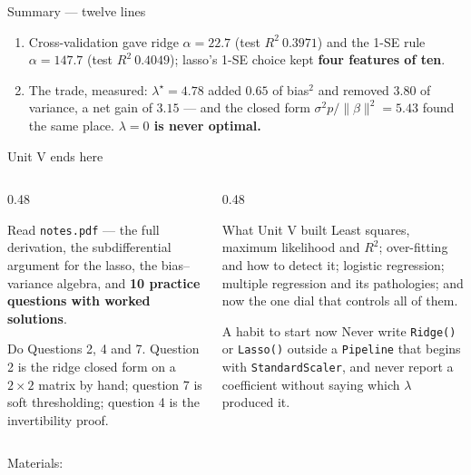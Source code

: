 \documentclass[aspectratio=169]{beamer}
\begin{document}
\begin{frame}[shrink=16]{Summary --- twelve lines}
\begin{enumerate}
      intercept by exactly $500.0000$ and no coefficient by more than
      $1.3\times10^{-14}$. Penalise it and $R^2 = -3.84$.
    \item Cross-validation gave ridge $\alpha = 22.7$ (test $R^2\ 0.3971$) and
      the 1-SE rule $\alpha = 147.7$ (test $R^2\ \mathbf{0.4049}$); lasso's
      1-SE choice kept \textbf{four features of ten}.
    \item The trade, measured: $\lambda^\star = 4.78$ added $0.65$ of
      bias$^2$ and removed $3.80$ of variance, a net gain of $3.15$ --- and
      the closed form $\sigma^2p/\|\beta\|^2 = 5.43$ found the same place.
      \textbf{$\lambda = 0$ is never optimal.}
  \end{enumerate}
\end{frame}

\begin{frame}[shrink=4]{Unit V ends here}
  \begin{columns}[T]
    \begin{column}{0.48\textwidth}
      \begin{block}{Read}
        \texttt{notes.pdf} --- the full derivation, the subdifferential
        argument for the lasso, the bias--variance algebra, and
        \textbf{10 practice questions with worked solutions}.
      \end{block}
      \begin{block}{Do}
        Questions 2, 4 and 7. Question 2 is the ridge closed form on a
        $2\times2$ matrix by hand; question 7 is soft thresholding; question
        4 is the invertibility proof.
      \end{block}
    \end{column}
    \begin{column}{0.48\textwidth}
      \begin{exampleblock}{What Unit V built}
        Least squares, maximum likelihood and $R^2$; over-fitting and how to
        detect it; logistic regression; multiple regression and its
        pathologies; and now the one dial that controls all of them.
      \end{exampleblock}
      \begin{alertblock}{A habit to start now}
        Never write \texttt{Ridge()} or \texttt{Lasso()} outside a
        \texttt{Pipeline} that begins with \texttt{StandardScaler}, and never
        report a coefficient without saying which $\lambda$ produced it.
      \end{alertblock}
    \end{column}
  \end{columns}
  \begin{center}
    \small Materials: \texttt{\AMLRepoURL}
  \end{center}
  \slidesources{\AMLUnitVSources}
\end{frame}
\end{document}
